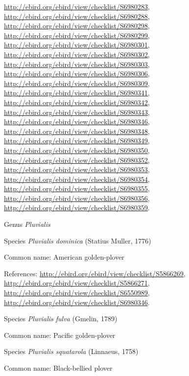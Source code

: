 \documentclass[9pt, article]{memoir}
\begin{document}
\begin{multicols}{2}
\url{http://ebird.org/ebird/view/checklist/S6980283}, 
\url{http://ebird.org/ebird/view/checklist/S6980288}, 
\url{http://ebird.org/ebird/view/checklist/S6980298}, 
\url{http://ebird.org/ebird/view/checklist/S6980299}, 
\url{http://ebird.org/ebird/view/checklist/S6980301}, 
\url{http://ebird.org/ebird/view/checklist/S6980302}, 
\url{http://ebird.org/ebird/view/checklist/S6980303}, 
\url{http://ebird.org/ebird/view/checklist/S6980306}, 
\url{http://ebird.org/ebird/view/checklist/S6980309}, 
\url{http://ebird.org/ebird/view/checklist/S6980341}, 
\url{http://ebird.org/ebird/view/checklist/S6980342}, 
\url{http://ebird.org/ebird/view/checklist/S6980343}, 
\url{http://ebird.org/ebird/view/checklist/S6980346}, 
\url{http://ebird.org/ebird/view/checklist/S6980348}, 
\url{http://ebird.org/ebird/view/checklist/S6980349}, 
\url{http://ebird.org/ebird/view/checklist/S6980350}, 
\url{http://ebird.org/ebird/view/checklist/S6980352}, 
\url{http://ebird.org/ebird/view/checklist/S6980353}, 
\url{http://ebird.org/ebird/view/checklist/S6980354}, 
\url{http://ebird.org/ebird/view/checklist/S6980355}, 
\url{http://ebird.org/ebird/view/checklist/S6980356}, 
\url{http://ebird.org/ebird/view/checklist/S6980359}.

\vspace{6pt}\noindent\hspace{30pt}Genus \textit{Pluvialis}


\vspace{6pt}\noindent\hspace{36pt}Species \textit{Pluvialis dominica} (Statius Muller, 1776)


Common name: American golden-plover

References: 
\url{http://ebird.org/ebird/view/checklist/S5866269}, 
\url{http://ebird.org/ebird/view/checklist/S5866271}, 
\url{http://ebird.org/ebird/view/checklist/S6550989}, 
\url{http://ebird.org/ebird/view/checklist/S6980346}.

\vspace{6pt}\noindent\hspace{36pt}Species \textit{Pluvialis fulva} (Gmelin, 1789)


Common name: Pacific golden-plover

\vspace{6pt}\noindent\hspace{36pt}Species \textit{Pluvialis squatarola} (Linnaeus, 1758)


Common name: Black-bellied plover


\end{multicols}
\end{document}
